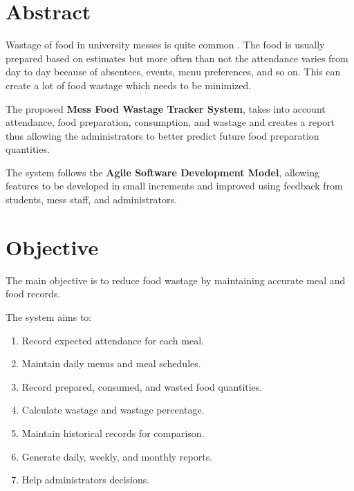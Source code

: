 \documentclass[12pt,a4paper]{report}
\begin{document}
	
	
	\tableofcontents
	\newpage
	
	
	\chapter{Abstract}
	
	Wastage of food in university messes is quite common . The food is usually prepared based on estimates but more often than not the attendance varies from day to day because of absentees, events, menu preferences, and so on. This can create a lot of food wastage which needs to be minimized.
	
	The proposed \textbf{Mess Food Wastage Tracker System}, takes into account attendance, food preparation, consumption, and wastage and creates a report thus allowing the administrators to better predict future  food preparation quantities.
	
	The system follows the \textbf{Agile Software Development Model}, allowing features to be developed in small increments and improved using feedback from students, mess staff, and administrators.
	
	
	\chapter{Objective}
	
	The main objective is to reduce food wastage by maintaining accurate meal and food records.
	
	The system aims to:
	
	\begin{enumerate}[leftmargin=*]
		\item Record expected attendance for each meal.
		\item Maintain daily menus and meal schedules.
		\item Record prepared, consumed, and wasted food quantities.
		\item Calculate wastage and wastage percentage.
		\item Maintain historical records for comparison.
		\item Generate daily, weekly, and monthly reports.
		\item Help administrators decisions.
	\end{enumerate}
	
\end{document}
